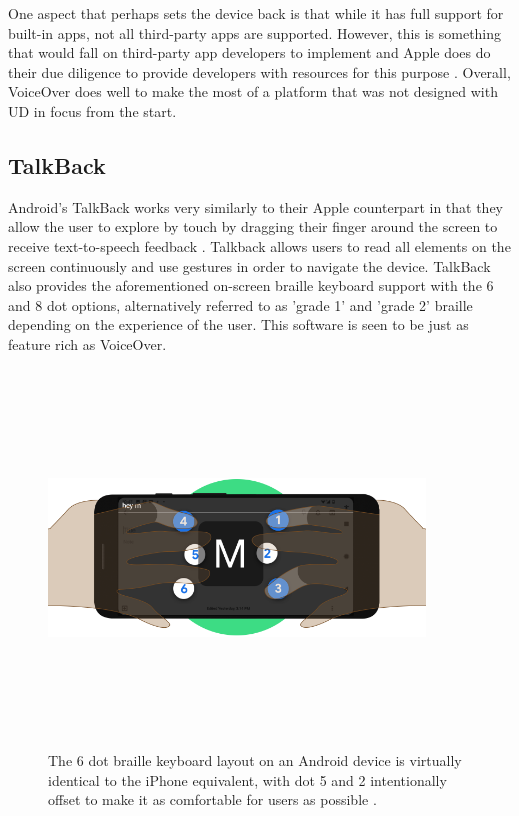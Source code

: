 One aspect that perhaps sets the device back is that while it has full support for built-in apps, not all third-party apps are supported.
However, this is something that would fall on third-party app developers to implement and Apple does do their due diligence to provide developers with resources for this purpose \cite{iphonedev}.
Overall, VoiceOver does well to make the most of a platform that was not designed with UD in focus from the start.


\subsection{TalkBack}

Android's TalkBack works very similarly to their Apple counterpart in that they allow the user to explore by touch by dragging their finger around the screen to receive text-to-speech feedback \cite{android}.
Talkback allows users to read all elements on the screen continuously and use gestures in order to navigate the device. %
TalkBack also provides the aforementioned on-screen braille keyboard support with the 6 and 8 dot options, alternatively referred to as 'grade 1' and 'grade 2' braille depending on the experience of the user.
This software is seen to be just as feature rich as VoiceOver.

\begin{figure} [h]
    \centering
    \includegraphics[width=10cm,height=10cm,keepaspectratio]{Figures/braille_keyboard.png}
    \caption{The 6 dot braille keyboard layout on an Android device is virtually identical to the iPhone equivalent, with dot 5 and 2 intentionally offset to make it as comfortable for users as possible \cite{braille}.}
    \label{fig:Jellybean}
\end{figure}

